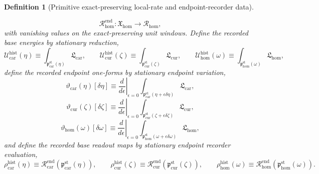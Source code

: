 \documentclass[11pt]{article}
\newcommand{\HomPhaseReadClass}{\mathscr R_{\mathrm{hom}}}
\newcommand{\HomWindowClass}{\mathfrak X_{\mathrm{hom}}}
\newcommand{\TensorLocalRate}{\mathfrak L_{\mathrm{car}}}
\newcommand{\CurLocalRate}{\mathfrak L_{\mathrm{cur}}}
\newcommand{\HomLocalRate}{\mathfrak L_{\mathrm{hom}}}
\newcommand{\TensorEndpointReadSeed}{\mathscr R_{\mathrm{car}}^{\mathrm{end}}}
\newcommand{\CurEndpointReadSeed}{\mathscr R_{\mathrm{cur}}^{\mathrm{end}}}
\newcommand{\HomEndpointReadSeed}{\mathscr R_{\mathrm{hom}}^{\mathrm{end}}}
\newcommand{\TensorStationaryWindow}{\mathfrak p_{\mathrm{car}}^{\mathrm{st}}}
\newcommand{\CurStationaryWindow}{\mathfrak p_{\mathrm{cur}}^{\mathrm{st}}}
\newcommand{\HomStationaryWindow}{\mathfrak p_{\mathrm{hom}}^{\mathrm{st}}}
\newtheorem{definition}{Definition}
\begin{document}
\begin{definition}[Primitive exact-preserving local-rate and endpoint-recorder data]
\begin{enumerate}
\[    \HomEndpointReadSeed:\HomWindowClass\to\HomPhaseReadClass,
    \]
    with vanishing values on the exact-preserving unit windows. Define the recorded base energies by stationary reduction,
    \begin{equation}
    \mathcal U_{\mathrm{car}}^{\mathrm{hist}}(\eta)\equiv\int_{\TensorStationaryWindow(\eta)}\TensorLocalRate,\qquad
    \mathcal U_{\mathrm{cur}}^{\mathrm{hist}}(\zeta)\equiv\int_{\CurStationaryWindow(\zeta)}\CurLocalRate,\qquad
    \mathcal U_{\mathrm{hom}}^{\mathrm{hist}}(\omega)\equiv\int_{\HomStationaryWindow(\omega)}\HomLocalRate,
    \label{eq:base_energies_from_windows}
    \end{equation}
    define the recorded endpoint one-forms by stationary endpoint variation,
    \begin{equation}
    \vartheta_{\mathrm{car}}(\eta)[\delta\eta]
    \equiv
    \left.\frac{d}{d\epsilon}\right|_{\epsilon=0}
    \int_{\TensorStationaryWindow(\eta+\epsilon\delta\eta)}\TensorLocalRate,
    \label{eq:endpoint_one_form_car}
    \end{equation}
    \begin{equation}
    \vartheta_{\mathrm{cur}}(\zeta)[\delta\zeta]
    \equiv
    \left.\frac{d}{d\epsilon}\right|_{\epsilon=0}
    \int_{\CurStationaryWindow(\zeta+\epsilon\delta\zeta)}\CurLocalRate,
    \label{eq:endpoint_one_form_cur}
    \end{equation}
    \begin{equation}
    \vartheta_{\mathrm{hom}}(\omega)[\delta\omega]
    \equiv
    \left.\frac{d}{d\epsilon}\right|_{\epsilon=0}
    \int_{\HomStationaryWindow(\omega+\epsilon\delta\omega)}\HomLocalRate,
    \label{eq:endpoint_one_form_hom}
    \end{equation}
    and define the recorded base readout maps by stationary endpoint recorder evaluation,
    \begin{equation}
    \rho_{\mathrm{car}}^{\mathrm{hist}}(\eta)\equiv\TensorEndpointReadSeed(\TensorStationaryWindow(\eta)),\qquad
    \rho_{\mathrm{cur}}^{\mathrm{hist}}(\zeta)\equiv\CurEndpointReadSeed(\CurStationaryWindow(\zeta)),\qquad
    \rho_{\mathrm{hom}}^{\mathrm{hist}}(\omega)\equiv\HomEndpointReadSeed(\HomStationaryWindow(\omega)).
    \label{eq:base_readout_from_windows}
    \end{equation}
\end{enumerate}
\end{definition}
\end{document}
